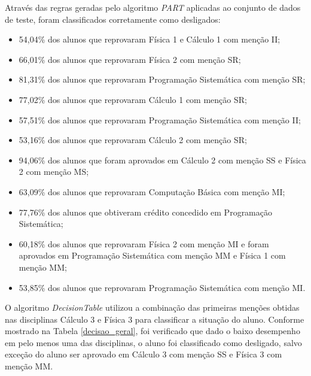 Através das regras geradas pelo algoritmo \textit{PART} aplicadas ao conjunto de dados de teste, foram classificados corretamente como desligados:
\begin{itemize} 
	\item 54,04\% dos alunos que reprovaram Física 1 e Cálculo 1 com menção II;
	\item 66,01\% dos alunos que reprovaram Física 2 com menção SR;
	\item 81,31\% dos alunos que reprovaram Programação Sistemática com menção SR;
	\item 77,02\% dos alunos que reprovaram Cálculo 1 com menção SR;
	\item 57,51\% dos alunos que reprovaram Programação Sistemática com menção II;
	\item 53,16\% dos alunos que reprovaram Cálculo 2 com menção SR;
	\item 94,06\% dos alunos que foram aprovados em Cálculo 2 com menção SS e Física 2 com menção MS;
	\item 63,09\% dos alunos que reprovaram Computação Básica com menção MI;
	\item 77,76\% dos alunos que obtiveram crédito concedido em Programação Sistemática;
	\item 60,18\% dos alunos que reprovaram Física 2 com menção MI e foram aprovados em Programação Sistemática com menção MM e Física 1 com menção MM;
	\item 53,85\% dos alunos que reprovaram Programação Sistemática com menção MI.
\end{itemize}

O algoritmo \textit{DecisionTable} utilizou a combinação das primeiras menções obtidas nas disciplinas Cálculo 3 e Física 3 para classificar a situação do aluno. Conforme mostrado na Tabela \ref{decisao_geral}, foi verificado que dado o baixo desempenho em pelo menos uma das disciplinas, o aluno foi classificado como desligado, salvo exceção do aluno ser aprovado em Cálculo 3 com menção SS e Física 3 com menção MM.

